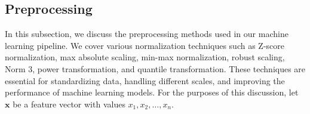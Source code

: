 \subsection{Preprocessing}
In this subsection, we discuss the preprocessing methods used in our machine learning pipeline.
We cover various normalization techniques such as Z-score normalization, max absolute scaling, min-max normalization, robust scaling, Norm 3, power transformation, and quantile transformation.
These techniques are essential for standardizing data, handling different scales, and improving the performance of machine learning models.
For the purposes of this discussion, let $\mathbf{x}$ be a feature vector with values $x_1, x_2, \ldots, x_n$.









